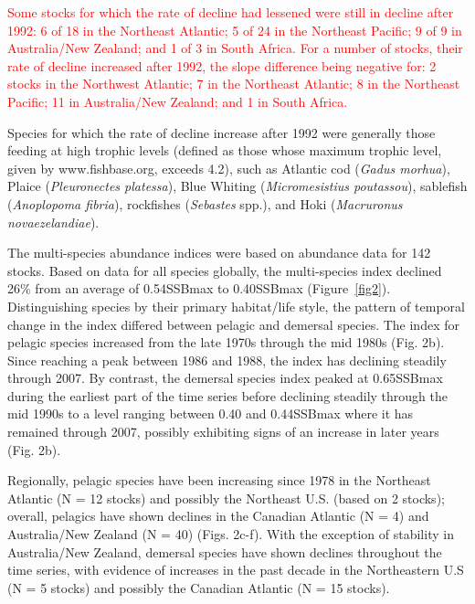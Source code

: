 \documentclass[letterpaper,12pt]{article}
\begin{document}
\textcolor{red}{
Some stocks for which the rate of decline had lessened were still in
decline after 1992: 6 of 18 in the Northeast Atlantic; 5 of 24 in the
Northeast Pacific; 9 of 9 in Australia/New Zealand; and 1 of 3 in
South Africa.  For a number of stocks, their rate of decline increased
after 1992, the slope difference being negative for: 2 stocks in the
Northwest Atlantic; 7 in the Northeast Atlantic; 8 in the Northeast
Pacific; 11 in Australia/New Zealand; and 1 in South Africa.
}

Species for which the rate of decline increase after 1992
were generally those feeding at high trophic levels (defined as those
whose maximum trophic level, given by www.fishbase.org, exceeds 4.2),
such as Atlantic cod (\emph{Gadus morhua}), Plaice (\emph{Pleuronectes
  platessa}), Blue Whiting (\emph{Micromesistius poutassou}),
sablefish (\emph{Anoplopoma fibria}), rockfishes (\emph{Sebastes}
spp.), and Hoki (\emph{Macruronus novaezelandiae}).  

The multi-species abundance indices were based on abundance data for
142 stocks.  Based on data for all species globally, the multi-species
index declined 26\% from an average of 0.54SSBmax to 0.40SSBmax
(Figure~\ref{fig2}).  Distinguishing species by their primary
habitat/life style, the pattern of temporal change in the index
differed between pelagic and demersal species. The index for pelagic
species increased from the late 1970s through the mid 1980s (Fig. 2b).
Since reaching a peak between 1986 and 1988, the index has declining
steadily through 2007.  By contrast, the demersal species index peaked
at 0.65SSBmax during the earliest part of the time series before
declining steadily through the mid 1990s to a level ranging between
0.40 and 0.44SSBmax where it has remained through 2007, possibly
exhibiting signs of an increase in later years (Fig. 2b).

Regionally, pelagic species have been
increasing since 1978 in the Northeast Atlantic (N = 12 stocks) and
possibly the Northeast U.S.  (based on 2 stocks); overall, pelagics
have shown declines in the Canadian Atlantic (N = 4) and Australia/New
Zealand (N = 40) (Figs.  2c-f). With the exception of stability in
Australia/New Zealand, demersal species have shown declines throughout
the time series, with evidence of increases in the past decade in the
Northeastern U.S (N = 5 stocks) and possibly the Canadian Atlantic (N
= 15 stocks).
\end{document}
